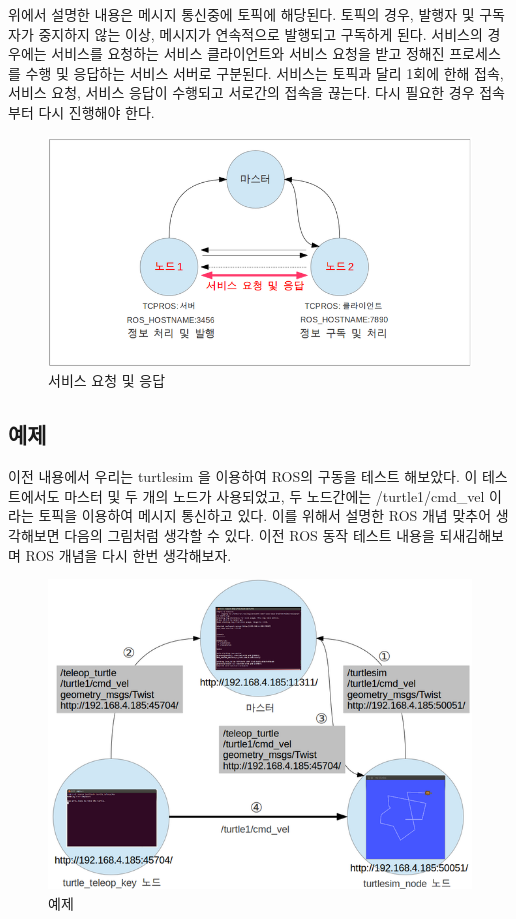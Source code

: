 위에서 설명한 내용은 메시지 통신중에 토픽에 해당된다. 토픽의 경우, 발행자 및 구독자가 중지하지 않는 이상, 메시지가 연속적으로 발행되고 구독하게 된다. 서비스의 경우에는 서비스를 요청하는 서비스 클라이언트와 서비스 요청을 받고 정해진 프로세스를 수행 및 응답하는 서비스 서버로 구분된다. 서비스는 토픽과 달리 1회에 한해 접속, 서비스 요청, 서비스 응답이 수행되고 서로간의 접속을 끊는다. 다시 필요한 경우 접속부터 다시 진행해야 한다. 

\begin{figure}[h]
\centering\includegraphics[width=0.6\columnwidth]{pictures/chapter4/notion9.png}
\caption{서비스 요청 및 응답}
\end{figure}

\subsection{예제}

이전 내용에서 우리는 turtlesim 을 이용하여 ROS의 구동을 테스트 해보았다. 이 테스트에서도 마스터 및 두 개의 노드가 사용되었고, 두 노드간에는 /turtle1/cmd\_vel 이라는 토픽을 이용하여 메시지 통신하고 있다. 이를 위해서 설명한 ROS 개념 맞추어 생각해보면 다음의 그림처럼 생각할 수 있다. 이전 ROS 동작 테스트 내용을 되새김해보며 ROS 개념을 다시 한번 생각해보자.

\begin{figure}[h]
\centering\includegraphics[width=0.6\columnwidth]{pictures/chapter4/notion10.png}
\caption{예제}
\end{figure}

